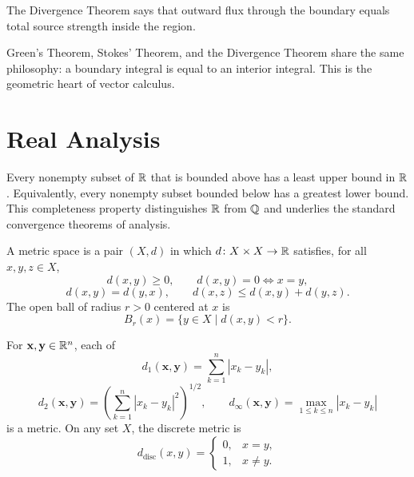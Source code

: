     \begin{idea}
        The Divergence Theorem says that outward flux through the boundary
        equals total source strength inside the region.
    \end{idea}

    \begin{remark}
        Green's Theorem, Stokes' Theorem, and the Divergence Theorem share the
        same philosophy: a boundary integral is equal to an interior integral.
        This is the geometric heart of vector calculus.
    \end{remark}

    \section*{Real Analysis}

    \begin{theorem}
        Every nonempty subset of $\mathbb{R}$ that is bounded above has a least upper
        bound in $\mathbb{R}$. Equivalently, every nonempty subset bounded below has a
        greatest lower bound. This completeness property distinguishes $\mathbb{R}$
        from $\mathbb{Q}$ and underlies the standard convergence theorems of analysis.
    \end{theorem}

    \begin{definition}
        A metric space is a pair $(X,d)$ in which $d\colon X\times X\to\mathbb{R}$ satisfies,
        for all $x,y,z\in X$,
        \[
            d(x,y)\geq 0,
            \qquad
            d(x,y)=0\Leftrightarrow x=y,
        \]
        \[
            d(x,y)=d(y,x),
            \qquad
            d(x,z)\leq d(x,y)+d(y,z).
        \]
        The open ball of radius $r>0$ centered at $x$ is
        \[
            B_r(x)=\{y\in X\mid d(x,y)<r\}.
        \]
    \end{definition}

    \begin{fact}
        For $\mathbf{x},\mathbf{y}\in\mathbb{R}^n$, each of
        \[
            d_1(\mathbf{x},\mathbf{y})
            =
            \sum_{k=1}^{n}|x_k-y_k|,
        \]
        \[
            d_2(\mathbf{x},\mathbf{y})
            =
            \left(
                \sum_{k=1}^{n}|x_k-y_k|^2
            \right)^{1/2},
            \qquad
            d_\infty(\mathbf{x},\mathbf{y})
            =
            \max_{1\leq k\leq n}|x_k-y_k|
        \]
        is a metric. On any set $X$, the discrete metric is
        \[
            d_{\mathrm{disc}}(x,y)
            =
            \begin{cases}
                0, & x=y,\\
                1, & x\neq y.
            \end{cases}
        \]
    \end{fact}

